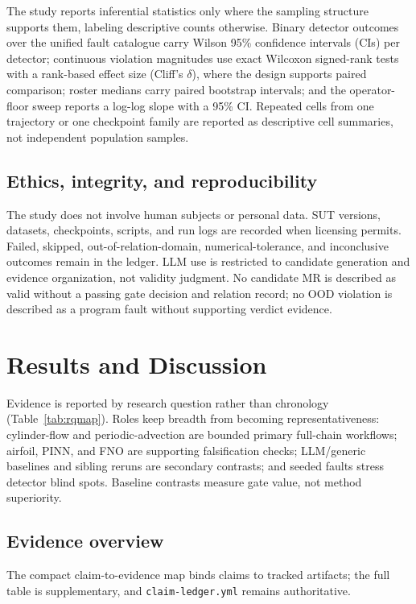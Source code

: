 \documentclass[preprint,12pt,authoryear]{elsarticle}
\begin{document}
The study reports inferential statistics only where the sampling structure supports them, labeling descriptive counts otherwise. Binary detector outcomes over the unified fault catalogue carry Wilson 95\% confidence intervals (CIs) per detector; continuous violation magnitudes use exact Wilcoxon signed-rank tests with a rank-based effect size (Cliff's $\delta$), where the design supports paired comparison; roster medians carry paired bootstrap intervals; and the operator-floor sweep reports a log-log slope with a 95\% CI. Repeated cells from one trajectory or one checkpoint family are reported as descriptive cell summaries, not independent population samples.

\subsection{Ethics, integrity, and reproducibility}
\label{subsec:ethics}

The study does not involve human subjects or personal data. SUT versions, datasets, checkpoints, scripts, and run logs are recorded when licensing permits. Failed, skipped, out-of-relation-domain, numerical-tolerance, and inconclusive outcomes remain in the ledger. LLM use is restricted to candidate generation and evidence organization, not validity judgment. No candidate MR is described as valid without a passing gate decision and relation record; no OOD violation is described as a program fault without supporting verdict evidence.

\section{Results and Discussion}
\label{sec:results}

Evidence is reported by research question rather than chronology (Table~\ref{tab:rqmap}). Roles keep breadth from becoming representativeness: cylinder-flow and periodic-advection are bounded primary full-chain workflows; airfoil, PINN, and FNO are supporting falsification checks; LLM/generic baselines and sibling reruns are secondary contrasts; and seeded faults stress detector blind spots. Baseline contrasts measure gate value, not method superiority.

\subsection{Evidence overview}
\label{subsec:claim-evidence-map}

The compact claim-to-evidence map binds claims to tracked artifacts; the full table is supplementary, and \texttt{claim-ledger.yml} remains authoritative.
\end{document}
